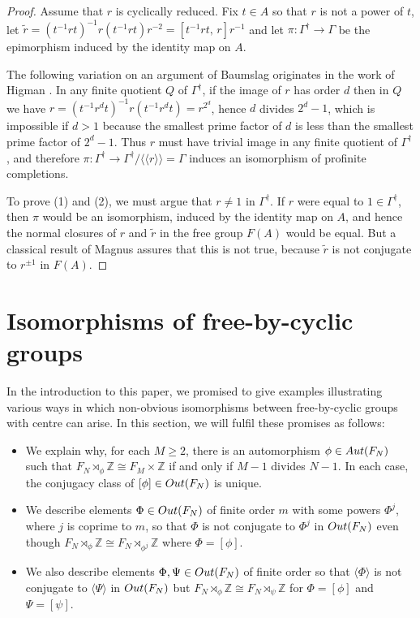 \documentclass[11pt, a4 paper]{amsart}
\numberwithin{equation}{section}
\theoremstyle{remark}
\theoremstyle{definition}
\def\Z{\mathbb Z}
\def\G{\Gamma}
\def\autN{{\rm{Aut}}(F_N)}
\def\outN{{\rm{Out}}(F_N)}
\def\G{\Gamma}
\def\<{\langle}
\def\>{\rangle}
\begin{document}
\begin{proof} Assume that $r$ is cyclically reduced.
	Fix $t\in A$ so that $r$ is not a power of $t$, let $\tilde{r} = (t^{-1}rt)^{-1}r(t^{-1}rt)r^{-2}=[t^{-1}rt,\, r]r^{-1}$
	and let $\pi:  \G^\dagger \to \G$ be the epimorphism induced by the identity map on $A$.
	
	The following variation on an argument of Baumslag \cite{baumslag1969non} 
	originates in the work of Higman \cite{higman1951finitely}. 
	In any finite quotient $Q$ of $\G^\dagger$, if the image of $r$ has order $d$ then
	in $Q$ we have $r=(t^{-1}r^dt)^{-1}r(t^{-1}r^dt)=r^{2^d}$, hence $d$ divides $2^d-1$, which is impossible if $d>1$ because the smallest prime factor of $d$
	is less than the smallest prime factor of $2^d-1$. Thus $r$ must have trivial image in any finite quotient of $\G^\dagger$, and
	therefore $\pi:\G^\dagger \to \G^\dagger/\<\! \<r\>\!\>= \G$ induces an isomorphism of profinite completions.
	
	To prove (1) and (2), we must argue that  $r\neq 1$ in $\G^\dagger$. If $r$ were equal to $1\in \G^\dagger$, then
	$\pi$ would be an isomorphism, induced by the identity map on $A$, and hence the normal closures of $r$ and $\tilde{r}$ in the free group $F(A)$ would be equal. 
	But a classical result of Magnus \cite{magnus} assures that this is not true, because $\tilde{r}$ is not conjugate to $r^{\pm 1}$ in $F(A)$.
\end{proof}



\section{Isomorphisms of free-by-cyclic groups}
\label{s:last}
\label{s:isomorphism}

In the introduction to this paper, we promised to give 
examples illustrating various ways in which non-obvious isomorphisms 
between free-by-cyclic groups with centre can arise. 
In this section, we will fulfil these promises as follows:

\smallskip
\begin{itemize}
	\item 
		We explain why, for each $M\ge 2$, 
		there is an automorphism $\phi\in\autN$ such that 
		$F_N\rtimes_{\phi}\Z\cong F_M\times\Z$ 
		if and only if $M-1$ divides $N-1$. 
		In each	case, 
		the conjugacy class of $[\phi]\in \outN$ is unique. 
	\item
		We describe elements $\Phi\in\outN$ of finite order $m$ 
		with some powers $\Phi^j$, where $j$ is coprime to $m$, 
		so that $\Phi$ is not conjugate to $\Phi^j$ in $\outN$ 
		even though $F_N\rtimes_\phi\Z\cong F_N\rtimes_{\phi^j}\Z$ 
		where $\Phi = [\phi]$.  
	\item
		We also describe elements $\Phi,\Psi\in\outN$ 
		of finite order so that 
		$\<\Phi\>$ is not conjugate to $\<\Psi\>$ in $\outN$ 
		but $F_N\rtimes_\phi\Z\cong F_N\rtimes_{\psi}\Z$ 
		for $\Phi = [\phi]$ and $\Psi = [\psi]$.
\end{itemize}
\smallskip
\end{document}
